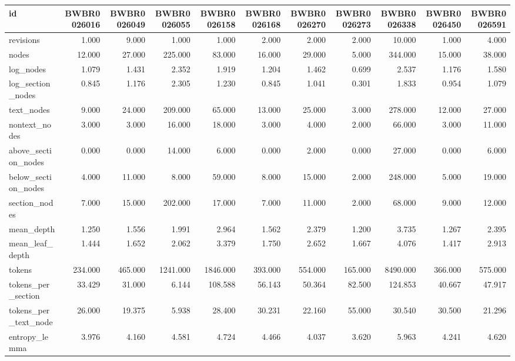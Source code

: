 \begin{tabular}{lrrrrrrrrrr}
\toprule
id & BWBR0026016 & BWBR0026049 & BWBR0026055 & BWBR0026158 & BWBR0026168 & BWBR0026270 & BWBR0026273 & BWBR0026338 & BWBR0026450 & BWBR0026591 \\
\midrule
revisions & 1.000 & 9.000 & 1.000 & 1.000 & 2.000 & 2.000 & 2.000 & 10.000 & 1.000 & 4.000 \\
\cline{1-11}
nodes & 12.000 & 27.000 & 225.000 & 83.000 & 16.000 & 29.000 & 5.000 & 344.000 & 15.000 & 38.000 \\
\cline{1-11}
log\_nodes & 1.079 & 1.431 & 2.352 & 1.919 & 1.204 & 1.462 & 0.699 & 2.537 & 1.176 & 1.580 \\
\cline{1-11}
log\_section\_nodes & 0.845 & 1.176 & 2.305 & 1.230 & 0.845 & 1.041 & 0.301 & 1.833 & 0.954 & 1.079 \\
\cline{1-11}
text\_nodes & 9.000 & 24.000 & 209.000 & 65.000 & 13.000 & 25.000 & 3.000 & 278.000 & 12.000 & 27.000 \\
\cline{1-11}
nontext\_nodes & 3.000 & 3.000 & 16.000 & 18.000 & 3.000 & 4.000 & 2.000 & 66.000 & 3.000 & 11.000 \\
\cline{1-11}
above\_section\_nodes & 0.000 & 0.000 & 14.000 & 6.000 & 0.000 & 2.000 & 0.000 & 27.000 & 0.000 & 6.000 \\
\cline{1-11}
below\_section\_nodes & 4.000 & 11.000 & 8.000 & 59.000 & 8.000 & 15.000 & 2.000 & 248.000 & 5.000 & 19.000 \\
\cline{1-11}
section\_nodes & 7.000 & 15.000 & 202.000 & 17.000 & 7.000 & 11.000 & 2.000 & 68.000 & 9.000 & 12.000 \\
\cline{1-11}
mean\_depth & 1.250 & 1.556 & 1.991 & 2.964 & 1.562 & 2.379 & 1.200 & 3.735 & 1.267 & 2.395 \\
\cline{1-11}
mean\_leaf\_depth & 1.444 & 1.652 & 2.062 & 3.379 & 1.750 & 2.652 & 1.667 & 4.076 & 1.417 & 2.913 \\
\cline{1-11}
tokens & 234.000 & 465.000 & 1241.000 & 1846.000 & 393.000 & 554.000 & 165.000 & 8490.000 & 366.000 & 575.000 \\
\cline{1-11}
tokens\_per\_section & 33.429 & 31.000 & 6.144 & 108.588 & 56.143 & 50.364 & 82.500 & 124.853 & 40.667 & 47.917 \\
\cline{1-11}
tokens\_per\_text\_node & 26.000 & 19.375 & 5.938 & 28.400 & 30.231 & 22.160 & 55.000 & 30.540 & 30.500 & 21.296 \\
\cline{1-11}
entropy\_lemma & 3.976 & 4.160 & 4.581 & 4.724 & 4.466 & 4.037 & 3.620 & 5.963 & 4.241 & 4.620 \\

\end{tabular}
